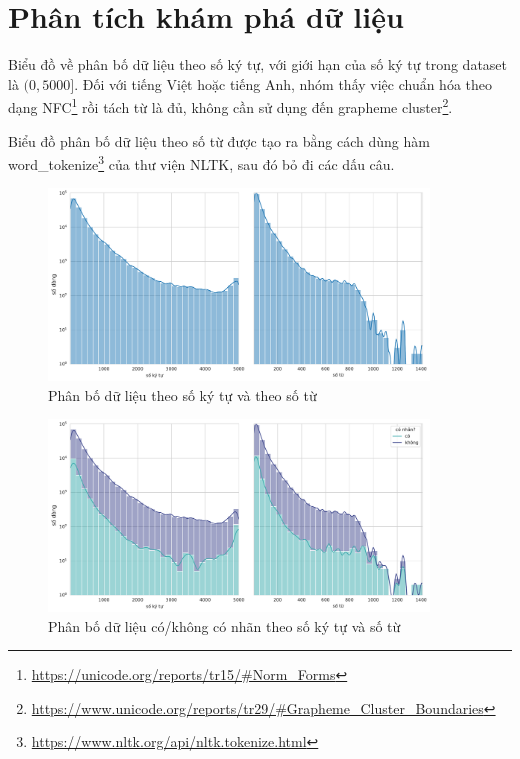 \section{Phân tích khám phá dữ liệu}
Biểu đồ về phân bố dữ liệu theo số ký tự, với giới hạn của số ký tự trong dataset là $(0,5000]$. Đối với tiếng Việt hoặc tiếng Anh, nhóm thấy việc chuẩn hóa theo dạng NFC\footnote{\url{https://unicode.org/reports/tr15/\#Norm\_Forms}} rồi tách từ là đủ, không cần sử dụng đến grapheme cluster\footnote{\url{https://www.unicode.org/reports/tr29/\#Grapheme\_Cluster\_Boundaries}}.

Biểu đồ phân bố dữ liệu theo số từ được tạo ra bằng cách dùng hàm word\_tokenize\footnote{\url{https://www.nltk.org/api/nltk.tokenize.html}} của thư viện NLTK, sau đó bỏ đi các dấu câu.
\begin{figure}[htb]
    \centering
    \includegraphics[width=0.9\textwidth]{chapter_2/image/dist_num_chars_and_words.pdf}
    \caption{Phân bố dữ liệu theo số ký tự và theo số từ}
    \label{figure:dist_num_chars_and_words}
\end{figure}
\begin{figure}[htb]
    \centering
    \includegraphics[width=0.9\textwidth]{chapter_2/image/dist_num_chars_and_words_by_has_label.pdf}
    \caption{Phân bố dữ liệu có/không có nhãn theo số ký tự và số từ}
\end{figure}

